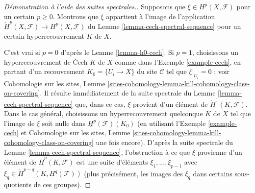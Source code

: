 \begin{proof}[Démonstration à l'aide des suites spectrales.]
Supposons que $\xi \in H^p(X, \mathcal{F})$ pour un certain $p \geq 0$.
Montrons que $\xi$ appartient à l'image de l'application
$\check{H}^p(X, \mathcal{F}) \to H^p(X, \mathcal{F})$ du
Lemme \ref{lemma-cech-spectral-sequence}
pour un certain hyperrecouvrement $K$ de $X$.

\medskip\noindent
C'est vrai si $p = 0$ d'après le Lemme \ref{lemma-h0-cech}.
Si $p = 1$, choisissons un hyperrecouvrement de {\v C}ech $K$ de $X$ comme dans
l'Exemple \ref{example-cech}, en partant d'un recouvrement
$K_0 = \{U_i \to X\}$ du site $\mathcal{C}$ tel que
$\xi|_{U_i} = 0$ ; voir
Cohomologie sur les sites,
Lemme \ref{sites-cohomology-lemma-kill-cohomology-class-on-covering}.
Il résulte immédiatement de la suite spectrale
du Lemme \ref{lemma-cech-spectral-sequence} que, dans ce cas, $\xi$ provient
d'un élément de $\check{H}^1(K, \mathcal{F})$.
Dans le cas général, choisissons un hyperrecouvrement quelconque $K$ de $X$
tel que l'image de $\xi$ soit nulle dans $\underline{H}^p(\mathcal{F})(K_0)$
(en utilisant l'Exemple \ref{example-cech} et
Cohomologie sur les sites,
Lemme \ref{sites-cohomology-lemma-kill-cohomology-class-on-covering}
une fois encore).
D'après la suite spectrale du Lemme \ref{lemma-cech-spectral-sequence},
l'obstruction à ce que $\xi$ provienne d'un élément de
$\check{H}^p(K, \mathcal{F})$ est une suite d'éléments
$\xi_1, \ldots, \xi_{p - 1}$ avec
$\xi_q \in \check{H}^{p - q}(K, \underline{H}^q(\mathcal{F}))$
(plus précisément, les images des $\xi_q$ dans certains sous-quotients
de ces groupes).


\end{proof}
